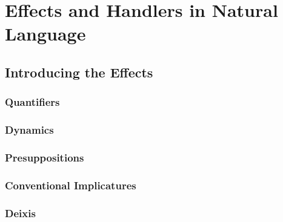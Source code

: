 \documentclass{report}
\begin{document}
\part{Effects and Handlers in Natural Language}

\chapter{Introducing the Effects}
\section{Quantifiers}
\section{Dynamics}
\section{Presuppositions}
\section{Conventional Implicatures}
\section{Deixis}





\end{document}
